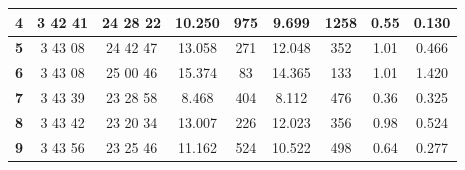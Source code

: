 \documentclass[12pt]{article}
\begin{document}
\begin{table}[H]
{\begin{tabular}{|c|c|c|c|c|c|c|c|c|}
        \textbf{4}    & 3  42  41                                                        & 24  28  22                                                         & 10.250     & 975                                                        & 9.699      & 1258                                                       & 0.55         & 0.130                                                            \\ \hline
        \textbf{5}    & 3  43  08                                                        & 24  42  47                                                         & 13.058     & 271                                                        & 12.048     & 352                                                        & 1.01         & 0.466                                                            \\ \hline
        \textbf{6}    & 3  43  08                                                        & 25  00  46                                                         & 15.374     & 83                                                         & 14.365     & 133                                                        & 1.01         & 1.420                                                            \\ \hline
        \textbf{7}    & 3  43  39                                                        & 23  28  58                                                         & 8.468      & 404                                                        & 8.112      & 476                                                        & 0.36         & 0.325                                                            \\ \hline
        \textbf{8}    & 3  43  42                                                        & 23  20  34                                                         & 13.007     & 226                                                        & 12.023     & 356                                                        & 0.98         & 0.524                                                            \\ \hline
        \textbf{9}    & 3  43  56                                                        & 23  25  46                                                         & 11.162     & 524                                                        & 10.522     & 498                                                        & 0.64         & 0.277                                                            \\ \hline

\end{tabular}}
\end{table}
\end{document}
